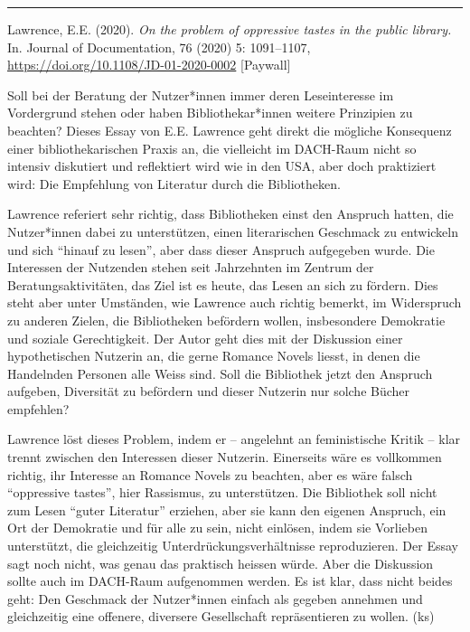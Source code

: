 \documentclass[a4paper,
fontsize=11pt,
oneside,
numbers=noperiodatend,
parskip=half-,
bibliography=totoc,
final
]{scrartcl}
\begin{document}
\begin{center}\rule{0.5\linewidth}{0.5pt}\end{center}

Lawrence, E.E. (2020). \emph{On the problem of oppressive tastes in the
public library.} In. Journal of Documentation, 76 (2020) 5: 1091--1107,
\url{https://doi.org/10.1108/JD-01-2020-0002} {[}Paywall{]}

Soll bei der Beratung der Nutzer*innen immer deren Leseinteresse im
Vordergrund stehen oder haben Bibliothekar*innen weitere Prinzipien zu
beachten? Dieses Essay von E.E. Lawrence geht direkt die mögliche
Konsequenz einer bibliothekarischen Praxis an, die vielleicht im
DACH-Raum nicht so intensiv diskutiert und reflektiert wird wie in den
USA, aber doch praktiziert wird: Die Empfehlung von Literatur durch die
Bibliotheken.

Lawrence referiert sehr richtig, dass Bibliotheken einst den Anspruch
hatten, die Nutzer*innen dabei zu unterstützen, einen literarischen
Geschmack zu entwickeln und sich \enquote{hinauf zu lesen}, aber dass
dieser Anspruch aufgegeben wurde. Die Interessen der Nutzenden stehen
seit Jahrzehnten im Zentrum der Beratungsaktivitäten, das Ziel ist es
heute, das Lesen an sich zu fördern. Dies steht aber unter Umständen,
wie Lawrence auch richtig bemerkt, im Widerspruch zu anderen Zielen, die
Bibliotheken befördern wollen, insbesondere Demokratie und soziale
Gerechtigkeit. Der Autor geht dies mit der Diskussion einer
hypothetischen Nutzerin an, die gerne Romance Novels liesst, in denen
die Handelnden Personen alle Weiss sind. Soll die Bibliothek jetzt den
Anspruch aufgeben, Diversität zu befördern und dieser Nutzerin nur
solche Bücher empfehlen?

Lawrence löst dieses Problem, indem er -- angelehnt an feministische
Kritik -- klar trennt zwischen den Interessen dieser Nutzerin.
Einerseits wäre es vollkommen richtig, ihr Interesse an Romance Novels
zu beachten, aber es wäre falsch \enquote{oppressive tastes}, hier
Rassismus, zu unterstützen. Die Bibliothek soll nicht zum Lesen
\enquote{guter Literatur} erziehen, aber sie kann den eigenen Anspruch,
ein Ort der Demokratie und für alle zu sein, nicht einlösen, indem sie
Vorlieben unterstützt, die gleichzeitig Unterdrückungsverhältnisse
reproduzieren. Der Essay sagt noch nicht, was genau das praktisch
heissen würde. Aber die Diskussion sollte auch im DACH-Raum aufgenommen
werden. Es ist klar, dass nicht beides geht: Den Geschmack der
Nutzer*innen einfach als gegeben annehmen und gleichzeitig eine
offenere, diversere Gesellschaft repräsentieren zu wollen. (ks)
\end{document}
